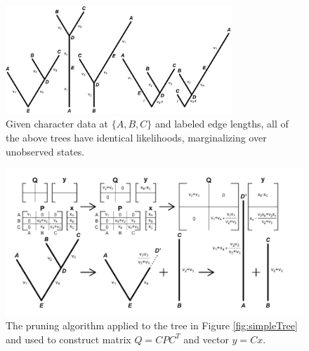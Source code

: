 \documentclass[10pt, twocolumn, twoside]{article}
\begin{document}
\begin{figure}[th]
\centering
\includegraphics[width=85mm]{figures/identicalLikelihoods.png}
\caption[Visualizing the Pulley Principle Under mvBM]{Given character data at $\{A, B, C\}$ and labeled edge lengths, all of the above trees have identical likelihoods, marginalizing over unobserved states. \label{overflow}
\label{fig:pulleyPrinciple}
}
\end{figure}

\begin{figure}[h]
\centering
\includegraphics[width=160mm]{figures/pruningAlgorithm.png}
\caption[The Pruning Algorithm Applied to a Tree]{The pruning algorithm applied to the tree in Figure \ref{fig:simpleTree} and used to construct matrix $Q = CPC^T$ and vector $y = Cx$. 
\label{overflow}
\label{fig:pruningAlgorithm}
}
\end{figure}
\end{document}

